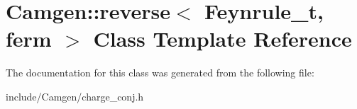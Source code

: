 \hypertarget{a00475}{}\section{Camgen\+:\+:reverse$<$ Feynrule\+\_\+t, ferm $>$ Class Template Reference}
\label{a00475}


The documentation for this class was generated from the following file\+:\begin{DoxyCompactItemize}
\item 
include/\+Camgen/charge\+\_\+conj.\+h\end{DoxyCompactItemize}
